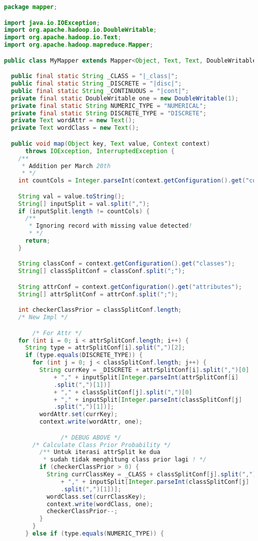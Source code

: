 \begin{lstlisting}[language=Java,basicstyle=\tiny,caption=MyMapper.java]
package mapper;

import java.io.IOException;
import org.apache.hadoop.io.DoubleWritable;
import org.apache.hadoop.io.Text;
import org.apache.hadoop.mapreduce.Mapper;

public class MyMapper extends Mapper<Object, Text, Text, DoubleWritable> {

  public final static String _CLASS = "|_class|";
  public final static String _DISCRETE = "|disc|";
  public final static String _CONTINUOUS = "|cont|";
  private final static DoubleWritable one = new DoubleWritable(1);
  private final static String NUMERIC_TYPE = "NUMERICAL";
  private final static String DISCRETE_TYPE = "DISCRETE";
  private Text wordAttr = new Text();
  private Text wordClass = new Text();

  public void map(Object key, Text value, Context context)
      throws IOException, InterruptedException {
    /**
     * Addition per March 20th
     * */
    int countCols = Integer.parseInt(context.getConfiguration().get("countCols").trim());

    String val = value.toString();
    String[] inputSplit = val.split(",");
    if (inputSplit.length != countCols) {
      /**
       * Ignoring record with missing value detected!
       * */
      return;
    }

    String classConf = context.getConfiguration().get("classes");
    String[] classSplitConf = classConf.split(";");

    String attrConf = context.getConfiguration().get("attributes");
    String[] attrSplitConf = attrConf.split(";");

    int checkerClassPrior = classSplitConf.length;
    /* New Impl */

		/* For Attr */
    for (int i = 0; i < attrSplitConf.length; i++) {
      String type = attrSplitConf[i].split(",")[2];
      if (type.equals(DISCRETE_TYPE)) {
        for (int j = 0; j < classSplitConf.length; j++) {
          String currKey = _DISCRETE + attrSplitConf[i].split(",")[0]
              + "," + inputSplit[Integer.parseInt(attrSplitConf[i]
              .split(",")[1])]
              + "," + classSplitConf[j].split(",")[0]
              + "," + inputSplit[Integer.parseInt(classSplitConf[j]
              .split(",")[1])];
          wordAttr.set(currKey);
          context.write(wordAttr, one);

				/* DEBUG ABOVE */
        /* Calculate Class Prior Probability */
          /** Untuk iterasi attrSplit ke dua
           * sudah tidak menghitung class prior lagi ! */
          if (checkerClassPrior > 0) {
            String currClassKey = _CLASS + classSplitConf[j].split(",")[0]
                + "," + inputSplit[Integer.parseInt(classSplitConf[j]
                .split(",")[1])];
            wordClass.set(currClassKey);
            context.write(wordClass, one);
            checkerClassPrior--;
          }
        }
      } else if (type.equals(NUMERIC_TYPE)) {


\end{lstlisting}
